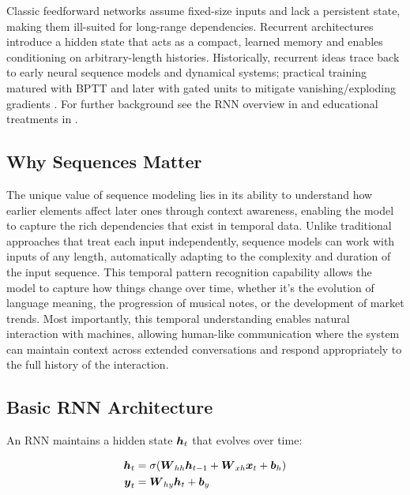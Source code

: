 Classic feedforward networks assume fixed-size inputs and lack a persistent state, making them ill-suited for long-range dependencies. Recurrent architectures introduce a hidden state that acts as a compact, learned memory  and enables conditioning on arbitrary-length histories. Historically, recurrent ideas trace back to early neural sequence models and dynamical systems; practical training matured with BPTT \cite{Rumelhart1986} and later with gated units to mitigate vanishing/exploding gradients \cite{Hochreiter1997}. For further background see the RNN overview in \cite{GoodfellowEtAl2016} and educational treatments in \cite{D2LChapterRNN,WebRNNWikipedia,WebDLBRNN}.


\subsection{Why Sequences Matter}

The unique value of sequence modeling lies in its ability to understand how earlier elements affect later ones through context awareness, enabling the model to capture the rich dependencies that exist in temporal data. Unlike traditional approaches that treat each input independently, sequence models can work with inputs of any length, automatically adapting to the complexity and duration of the input sequence. This temporal pattern recognition capability allows the model to capture how things change over time, whether it's the evolution of language meaning, the progression of musical notes, or the development of market trends. Most importantly, this temporal understanding enables natural interaction with machines, allowing human-like communication where the system can maintain context across extended conversations and respond appropriately to the full history of the interaction.

\subsection{Basic RNN Architecture}

An RNN maintains a hidden state $\boldsymbol{h}_t$ that evolves over time:

\begin{align}
\boldsymbol{h}_t &= \sigma(\boldsymbol{W}_{hh} \boldsymbol{h}_{t-1} + \boldsymbol{W}_{xh} \boldsymbol{x}_t + \boldsymbol{b}_h) \\
\boldsymbol{y}_t &= \boldsymbol{W}_{hy} \boldsymbol{h}_t + \boldsymbol{b}_y
\end{align}

